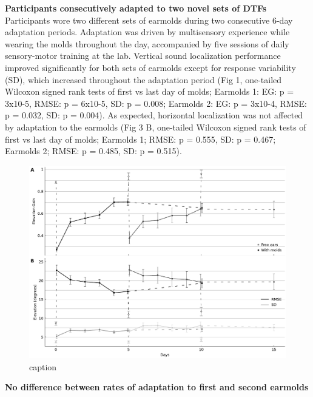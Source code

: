 \noindent\textbf{Participants consecutively adapted to two novel sets of DTFs}\\
 
Participants wore two different sets of earmolds during two consecutive 6-day adaptation periods. Adaptation was driven by multisensory experience while wearing the molds throughout the day, accompanied by five sessions of daily sensory-motor training at the lab. Vertical sound localization performance improved significantly for both sets of earmolds except for response variability (SD), which increased throughout the adaptation period (Fig 1, one-tailed Wilcoxon signed rank tests of first vs last day of molds; Earmolds 1: EG: p = 3x10-5, RMSE: p = 6x10-5, SD: p = 0.008; Earmolds 2: EG: p = 3x10-4, RMSE: p = 0.032, SD: p = 0.004). As expected, horizontal localization was not affected by adaptation to the earmolds (Fig 3 B, one-tailed Wilcoxon signed rank tests of first vs last day of molds; Earmolds 1; RMSE: p = 0.555, SD: p = 0.467; Earmolds 2; RMSE: p = 0.485, SD: p = 0.515).\\

 \begin{figure}[hb]
	\includegraphics[width=16cm, left]{../Results/figures/fig7/fig7}
	\caption{caption}
        \label{fig:first}
\end{figure}

\noindent \textbf{No difference between rates of adaptation to first and second earmolds}\\

